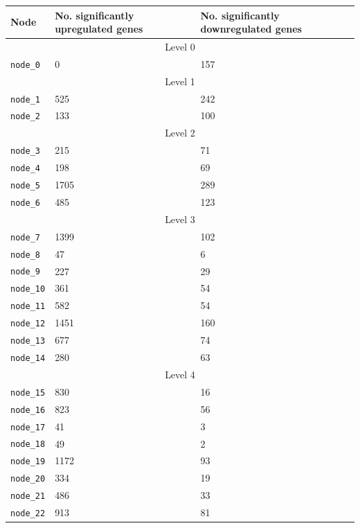 \begin{table}[]
    \centering
    \begin{tabular}{|p{3cm}||p{4cm}|p{4cm}|}
    \hline
    Node & No. significantly upregulated genes & No. significantly downregulated genes\\
    \hline
    \multicolumn{3}{|c|}{Level 0}\\
    \hline
        \texttt{node\_0} & 0 & 157 \\
    \hline
    \multicolumn{3}{|c|}{Level 1}\\
    \hline
        \texttt{node\_1} & 525 & 242 \\        \texttt{node\_2} & 133 & 100 \\
    \hline
    \multicolumn{3}{|c|}{Level 2}\\
    \hline
        \texttt{node\_3} & 215 & 71 \\
        \texttt{node\_4} & 198 & 69 \\
        \texttt{node\_5} & 1705 & 289 \\
        \texttt{node\_6} & 485 & 123 \\
    \hline
    \multicolumn{3}{|c|}{Level 3}\\
    \hline
        \texttt{node\_7} & 1399 & 102 \\
        \texttt{node\_8} & 47 & 6 \\
        \texttt{node\_9} & 227 & 29 \\
        \texttt{node\_10} & 361 & 54 \\
        \texttt{node\_11} & 582 & 54 \\
        \texttt{node\_12} & 1451 & 160 \\
        \texttt{node\_13} & 677 & 74 \\
        \texttt{node\_14} & 280 & 63 \\
    \hline
    \multicolumn{3}{|c|}{Level 4}\\
    \hline
        \texttt{node\_15} & 830 & 16 \\
        \texttt{node\_16} & 823 & 56 \\
        \texttt{node\_17} & 41 & 3 \\
        \texttt{node\_18} & 49 & 2 \\
        \texttt{node\_19} & 1172 & 93 \\
        \texttt{node\_20} & 334 & 19 \\
        \texttt{node\_21} & 486 & 33 \\
        \texttt{node\_22} & 913 & 81 \\

\end{tabular}
\end{table}
